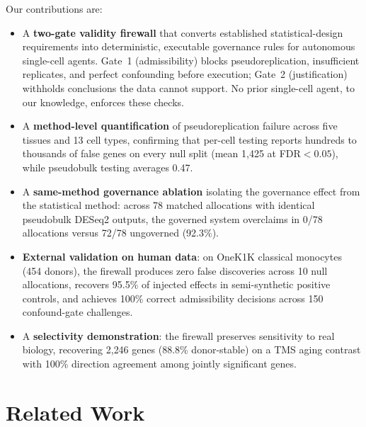 \documentclass[pmlr,twocolumn,10pt]{jmlr}
\begin{document}
Our contributions are:
\begin{itemize}
    \item A \textbf{two-gate validity firewall} that converts established
    statistical-design requirements into deterministic, executable governance
    rules for autonomous single-cell agents. Gate~1 (admissibility) blocks
    pseudoreplication, insufficient replicates, and perfect confounding before
    execution; Gate~2 (justification) withholds conclusions the data cannot
    support. No prior single-cell agent, to our knowledge, enforces these
    checks.
    \item A \textbf{method-level quantification} of pseudoreplication failure
    across five tissues and 13 cell types, confirming that per-cell testing
    reports hundreds to thousands of false genes on every null split (mean
    1{,}425 at FDR${<}0.05$), while pseudobulk testing averages 0.47.
    \item A \textbf{same-method governance ablation} isolating the governance
    effect from the statistical method: across 78 matched allocations with
    identical pseudobulk DESeq2 outputs, the governed system overclaims in
    0/78 allocations versus 72/78 ungoverned (92.3\%).
    \item \textbf{External validation on human data}: on OneK1K classical
    monocytes (454 donors), the firewall produces zero false discoveries across
    10 null allocations, recovers 95.5\% of injected effects in semi-synthetic
    positive controls, and achieves 100\% correct admissibility decisions
    across 150 confound-gate challenges.
    \item A \textbf{selectivity demonstration}: the firewall preserves
    sensitivity to real biology, recovering 2{,}246 genes (88.8\%
    donor-stable) on a TMS aging contrast with 100\% direction agreement
    among jointly significant genes.
\end{itemize}

\section{Related Work}
\end{document}
